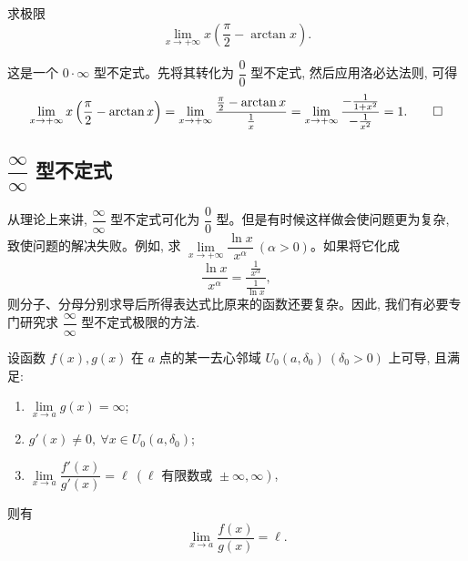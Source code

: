 \begin{example}\label{example:ma-5-2-3}
求极限
\[
  \lim_{x\to+\infty}x\left(\frac\pi2-\arctan x\right).
\]
\end{example}


\begin{solve}
这是一个 $0\cdot\infty$ 型不定式。先将其转化为 $\dfrac00$ 型不定式, 然后应用洛必达法则, 可得
\[
  \lim_{x\to+\infty}x\left(\frac\pi2-\arctan x\right)
  =
  \lim_{x\to+\infty}
  \frac{\frac\pi2-\arctan x}{\frac1x}
  =
  \lim_{x\to+\infty}
  \frac{-\frac1{1+x^2}}{-\frac1{x^2}}
  =
  1.
\qedhere
\]
\end{solve}


\subsection{\texorpdfstring{$\dfrac\infty\infty$ 型不定式}{∞/∞ 型不定式}}
\label{subsec:ma-5-2-2}

从理论上来讲, $\dfrac\infty\infty$ 型不定式可化为 $\dfrac00$ 型。但是有时候这样做会使问题更为复杂, 致使问题的解决失败。例如, 求 $\lim\limits_{x\to+\infty}\dfrac{\ln x}{x^\alpha}\ (\alpha>0)$。如果将它化成
\[
  \frac{\ln x}{x^\alpha}
  =
  \frac{\frac1{x^\alpha}}{\frac1{\ln x}},
\]
则分子、分母分别求导后所得表达式比原来的函数还要复杂。因此, 我们有必要专门研究求 $\dfrac\infty\infty$ 型不定式极限的方法.

\begin{theorem}\label{theorem:ma-5-2-3}
设函数 $f(x),g(x)$ 在 $a$ 点的某一去心邻域 $U_0(a,\delta_0)\ (\delta_0>0)$ 上可导, 且满足:
\begin{enumerate}
  \item $\lim\limits_{x\to a}g(x)=\infty$;
  \item $g'(x)\ne0,\ \forall x\in U_0(a,\delta_0)$;
  \item $\lim\limits_{x\to a}\dfrac{f'(x)}{g'(x)}=\ell\ (\ell\text{ 有限数或 }\pm\infty,\infty)$,
\end{enumerate}
则有
\[
  \lim_{x\to a}\frac{f(x)}{g(x)}=\ell.
\]
\end{theorem}


